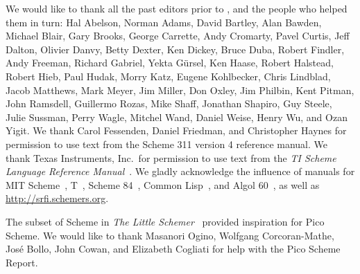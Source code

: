 We would like to thank all the past editors prior to \rsevenrs, and the
people who helped them in turn: Hal Abelson, Norman Adams, David
Bartley, Alan Bawden, Michael Blair, Gary Brooks, George Carrette,
Andy Cromarty, Pavel Curtis, Jeff Dalton, Olivier Danvy, Betty Dexter,
Ken Dickey,
Bruce Duba, Robert Findler, Andy Freeman, Richard Gabriel, Yekta
G\"ursel, Ken Haase, Robert Halstead, Robert Hieb, Paul Hudak, Morry
Katz, Eugene Kohlbecker, Chris Lindblad, Jacob Matthews, Mark Meyer,
Jim Miller, Don Oxley, Jim Philbin, Kent Pitman, John Ramsdell,
Guillermo Rozas, Mike Shaff, Jonathan Shapiro, Guy Steele, Julie
Sussman, Perry Wagle, Mitchel Wand, Daniel Weise, Henry Wu, and Ozan
Yigit.  We thank Carol Fessenden, Daniel Friedman, and Christopher
Haynes for permission to use text from the Scheme 311 version 4
reference manual.  We thank Texas Instruments, Inc.~for permission to
use text from the {\em TI Scheme Language Reference
Manual}~\cite{TImanual85}.  We gladly acknowledge the influence of
manuals for MIT Scheme~\cite{MITScheme}, T~\cite{Rees84}, Scheme
84~\cite{Scheme84}, Common Lisp~\cite{CLtL}, and Algol 60~\cite{Naur63},
as well as \url{http://srfi.schemers.org}.



The subset of Scheme in
{\em The Little Schemer}~\cite{LittleSchemer} provided inspiration for Pico Scheme. We would like to thank Masanori Ogino, Wolfgang Corcoran-Mathe, José Bollo, John Cowan, and Elizabeth Cogliati
for help with the Pico Scheme Report.


